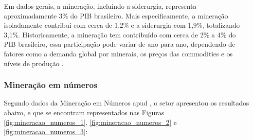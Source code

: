 Em dados gerais, a mineração, incluindo a siderurgia, representa aproximadamente 3\% do PIB brasileiro. Mais especificamente, a mineração isoladamente contribui com cerca de 1,2\% e a siderurgia com 1,9\%, totalizando 3,1\%. Historicamente, a mineração tem contribuído com cerca de 2\% a 4\% do PIB brasileiro, essa participação pode variar de ano para ano, dependendo de fatores como a demanda global por minerais, os preços das commodities e os níveis de produção \cite{apc2024industria}.

\subsubsection{Mineração em números}
\label{subsubsec:mineracao_numeros}

Segundo dados da Mineração em Números \cite{ibram2023coletiva} apud \cite{fonseca2024resultados}, o setor apresentou os resultados abaixo, e que se encontram
representados nas Figuras \ref{fig:mineracao_numeros_1}, \ref{fig:mineracao_numeros_2} e \ref{fig:mineracao_numeros_3}:


